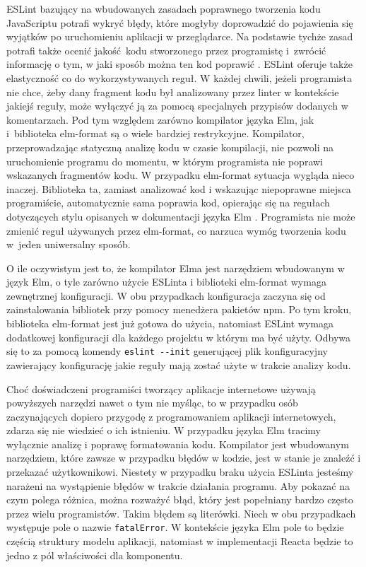 ESLint bazujący na wbudowanych zasadach poprawnego tworzenia kodu JavaScriptu potrafi wykryć błędy, które mogłyby doprowadzić do pojawienia się wyjątków po uruchomieniu aplikacji w przeglądarce. Na podstawie tychże zasad potrafi także ocenić jakość kodu stworzonego przez programistę i~zwrócić informację o tym, w jaki sposób można ten kod poprawić \cite{ESLint}. ESLint oferuje także elastyczność co do wykorzystywanych reguł. W każdej chwili, jeżeli programista nie chce, żeby dany fragment kodu był analizowany przez linter w kontekście jakiejś reguły, może wyłączyć ją za pomocą specjalnych przypisów dodanych w komentarzach. Pod tym względem zarówno kompilator języka Elm, jak i~biblioteka elm-format są o wiele bardziej restrykcyjne. Kompilator, przeprowadzając statyczną analizę kodu w czasie kompilacji, nie pozwoli na uruchomienie programu do momentu, w którym programista nie poprawi wskazanych fragmentów kodu. W przypadku elm-format sytuacja wygląda nieco inaczej. Biblioteka ta, zamiast analizować kod i wskazując niepoprawne miejsca programiście, automatycznie sama poprawia kod, opierając się na regułach dotyczących stylu opisanych w dokumentacji języka Elm \cite{elmStyleGuide}. Programista nie może zmienić reguł używanych przez elm-format, co narzuca wymóg tworzenia kodu w~jeden uniwersalny sposób.

O ile oczywistym jest to, że kompilator Elma jest narzędziem wbudowanym w język Elm, o tyle zarówno użycie ESLinta i biblioteki elm-format wymaga zewnętrznej konfiguracji. W obu przypadkach konfiguracja zaczyna się od zainstalowania bibliotek przy pomocy menedżera pakietów npm. Po tym kroku, biblioteka elm-format jest już gotowa do użycia, natomiast ESLint wymaga dodatkowej konfiguracji dla każdego projektu w którym ma być użyty. Odbywa się to za pomocą komendy \lstinline{eslint --init} generującej plik konfiguracyjny zawierający konfigurację jakie reguły mają zostać użyte w trakcie analizy kodu.

Choć doświadczeni programiści tworzący aplikacje internetowe używają powyższych narzędzi nawet o tym nie myśląc, to w przypadku osób zaczynających dopiero przygodę z programowaniem aplikacji internetowych, zdarza się nie wiedzieć o ich istnieniu. W przypadku języka Elm tracimy wyłącznie analizę i poprawę formatowania kodu. Kompilator jest wbudowanym narzędziem, które zawsze w przypadku błędów w kodzie, jest w stanie je znaleźć i przekazać użytkownikowi. Niestety w przypadku braku użycia ESLinta jesteśmy narażeni na wystąpienie błędów w trakcie działania programu. Aby pokazać na czym polega różnica, można rozważyć błąd, który jest popełniany bardzo często przez wielu programistów. Takim błędem są literówki. Niech w obu przypadkach występuje pole o nazwie \lstinline{fatalError}. W kontekście języka Elm pole to będzie częścią struktury modelu aplikacji, natomiast w implementacji Reacta będzie to jedno z pól właściwości dla komponentu.

